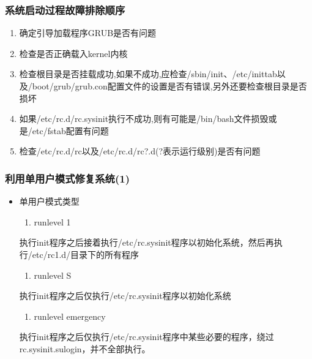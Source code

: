 \documentclass[xcolor=svgnames,presentation]{beamer}
\begin{document}
\begin{frame}
\frametitle{系统启动过程故障排除顺序}
\label{sec-1-8}

\begin{enumerate}
\item 确定引导加载程序GRUB是否有问题
\item 检查是否正确载入kernel内核
\item 检查根目录是否挂载成功,如果不成功,应检查/sbin/init、/etc/inittab以及/boot/grub/grub.con配置文件的设置是否有错误,另外还要检查根目录是否损坏
\item 如果/etc/rc.d/rc.sysinit执行不成功,则有可能是/bin/bash文件损毁或是/etc/fstab配置有问题
\item 检查/etc/rc.d/rc以及/etc/rc.d/rc?.d(?表示运行级别)是否有问题
\end{enumerate}
\end{frame}
\begin{frame}
\frametitle{利用单用户模式修复系统(1)}
\label{sec-1-9}
\begin{itemize}

\item 单用户模式类型
\label{sec-1-9-1}%
\begin{enumerate}
\item runlevel 1
\end{enumerate}
执行init程序之后接着执行/etc/rc.sysinit程序以初始化系统，然后再执行/etc/rc1.d/目录下的所有程序
\begin{enumerate}
\item runlevel S
\end{enumerate}
执行init程序之后仅执行/etc/rc.sysinit程序以初始化系统
\begin{enumerate}
\item runlevel emergency
\end{enumerate}
执行init程序之后仅执行/etc/rc.sysinit程序中某些必要的程序，绕过rc.sysinit.sulogin，并不全部执行。
\end{itemize} %
\end{frame}
\end{document}
